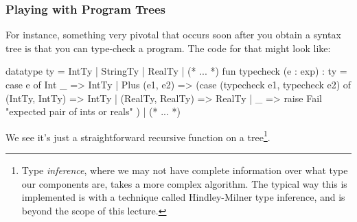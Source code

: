 \documentclass[aspectratio=169]{beamer}
\begin{document}
\begin{frame}[fragile]
  \frametitle{Playing with Program Trees}

  \tgs

  For instance, something very pivotal that occurs soon after you obtain
  a syntax tree is that you can type-check a program. The code for that
  might look like:

  \pause
  {\footnotesize
  \begin{codeblock}
    datatype ty = IntTy | StringTy | RealTy | (* ... *)
    fun typecheck (e : exp) : ty =
      case e of
        Int _ => IntTy
      | Plus (e1, e2) =>
          (case (typecheck e1, typecheck e2) of
            (IntTy, IntTy) => IntTy
          | (RealTy, RealTy) => RealTy
          | _ => raise Fail "expected pair of ints or reals"
          )
      | (* ... *)
  \end{codeblock}
  }

  \pause
  \vspace{\fill}

  We see it's just a straightforward recursive function on a tree\footnote{
    Type \textit{inference}, where we may not have complete information over
    what type our components are, takes a more complex algorithm. The
    typical way this is implemented is with a technique called Hindley-Milner
    type inference, and is beyond the scope of this lecture.
  }.
\end{frame}
\end{document}
